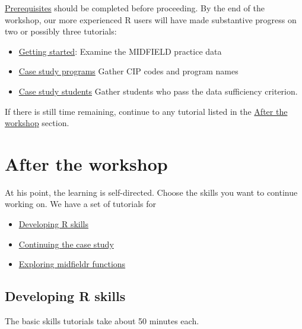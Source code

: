 \documentclass[
]{book}
\providecommand{\tightlist}{%
  \setlength{\itemsep}{0pt}\setlength{\parskip}{0pt}}
\begin{document}
\protect\hyperlink{prerequisites}{Prerequisites} should be completed before proceeding. By the end of the workshop, our more experienced R users will have made substantive progress on two or possibly three tutorials:

\begin{itemize}
\tightlist
\item
  \href{https://midfieldr.github.io/midfieldr/articles/art-000-getting-started.html}{Getting started}: Examine the MIDFIELD practice data\\
\item
  \href{https://midfieldr.github.io/midfieldr/articles/art-110-case-study-programs.html}{Case study programs} Gather CIP codes and program names
\item
  \href{https://midfieldr.github.io/midfieldr/articles/art-120-case-study-students.html}{Case study students} Gather students who pass the data sufficiency criterion.
\end{itemize}

If there is still time remaining, continue to any tutorial listed in the \protect\hyperlink{after-the-workshop}{After the workshop} section.

\hypertarget{after-the-workshop}{%
\section{After the workshop}\label{after-the-workshop}}

At his point, the learning is self-directed. Choose the skills you want to continue working on. We have a set of tutorials for

\begin{itemize}
\tightlist
\item
  \protect\hyperlink{developing-r-skills}{Developing R skills}
\item
  \protect\hyperlink{continuing-the-case-study}{Continuing the case study}
\item
  \protect\hyperlink{exploring-midfieldr-functions}{Exploring midfieldr functions}
\end{itemize}

\hypertarget{developing-r-skills}{%
\subsection{Developing R skills}\label{developing-r-skills}}

The basic skills tutorials take about 50 minutes each.
\end{document}
